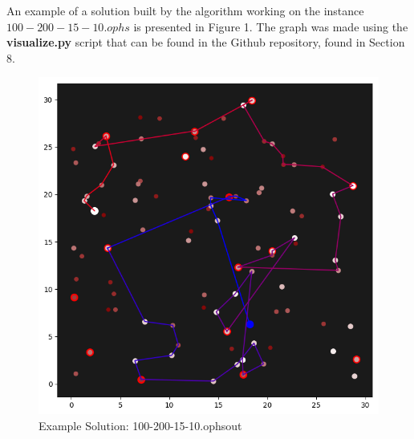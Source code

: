 An example of a solution built by the algorithm working on the instance $100-200-15-10.ophs$ is presented in Figure 1. The graph was made using the \textbf{visualize.py} script that can be found in the Github repository, found in Section 8.

\begin{figure}
    \centering
    \includegraphics[width=\textwidth]{pictures/70.png}
    \caption{Example Solution: 100-200-15-10.ophsout}
    \label{fig:examplesol}
\end{figure}
